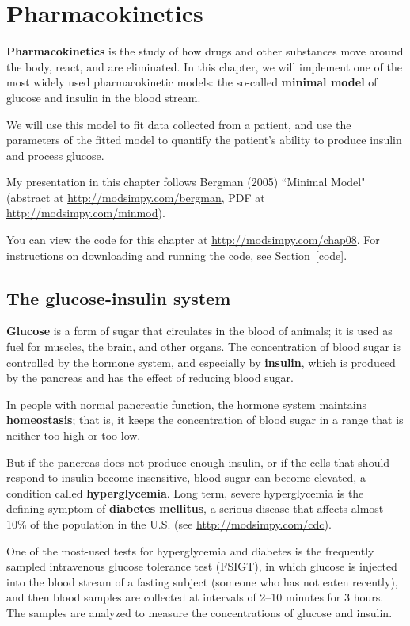 \documentclass[12pt]{book}
\theoremstyle{exercise}
\begin{document}
\chapter{Pharmacokinetics}

{\bf Pharmacokinetics} is the study of how drugs and other substances move around the body, react, and are eliminated.  In this chapter, we will implement one of the most widely used pharmacokinetic models: the so-called {\bf minimal model} of glucose and insulin in the blood stream.

We will use this model to fit data collected from a patient, and use the parameters of the fitted model to quantify the patient's ability to produce insulin and process glucose.

My presentation in this chapter follows Bergman (2005) ``Minimal Model" (abstract at \url{http://modsimpy.com/bergman},
PDF at \url{http://modsimpy.com/minmod}).

You can view the code for this chapter at \url{http://modsimpy.com/chap08}.  For instructions on downloading and running the code, see Section~\ref{code}.


\section{The glucose-insulin system}

{\bf Glucose} is a form of sugar that circulates in the blood of animals; it is used as fuel for muscles, the brain, and other organs.  The concentration of blood sugar is controlled by the hormone system, and especially by {\bf insulin}, which is produced by the pancreas and has the effect of reducing blood sugar.

In people with normal pancreatic function, the hormone system maintains {\bf homeostasis}; that is, it keeps the concentration of blood sugar in a range that is neither too high or too low.

But if the pancreas does not produce enough insulin, or if the cells that should respond to insulin become insensitive, blood sugar can become elevated, a condition called {\bf hyperglycemia}.  Long term, severe hyperglycemia is the defining symptom of {\bf diabetes mellitus}, a serious disease that affects almost 10\% of the population in the U.S. (see \url{http://modsimpy.com/cdc}).

One of the most-used tests for hyperglycemia and diabetes is the frequently sampled intravenous glucose tolerance test (FSIGT), in which glucose is injected into the blood stream of a fasting subject (someone who has not eaten recently), and then blood samples are collected at intervals of 2--10 minutes for 3 hours.  The samples are analyzed to measure the concentrations of glucose and insulin.
\end{document}

